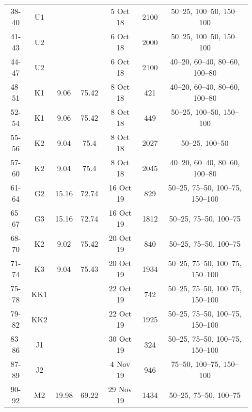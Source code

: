 \begin{table}[htbp]
{\begin{adjustwidth}{0.5in}{0in}
\begin{tabular}{ccccccc}
				38-40       & U1  &            &            & 5 Oct 18                  & 2100       & 50–25, 100–50, 150–100        \\
				41-43       & U2  &            &            & 6 Oct 18                  & 2000       & 50–25, 100–50, 150–100        \\
				44-47       & U2  &            &            & 6 Oct 18                  & 2100       & 40–20, 60–40, 80–60, 100–80   \\
				48-51       & K1  & 9.06       & 75.42      & 8 Oct 18                  & 421        & 40–20, 60–40, 80–60, 100–80   \\
				52-54       & K1  & 9.06       & 75.42      & 8 Oct 18                  & 449        & 50–25, 100–50, 150–100        \\
				55-56       & K2  & 9.04       & 75.4       & 8 Oct 18                  & 2027       & 50–25, 100–50                 \\
				57-60       & K2  & 9.04       & 75.4       & 8 Oct 18                  & 2045       & 40–20, 60–40, 80–60, 100–80   \\
				\midrule
				61-64       & G2  & 15.16      & 72.74      & 16 Oct 19                 & 829        & 50–25, 75–50, 100–75, 150–100 \\
				65-67       & G3  & 15.16      & 72.74      & 16 Oct 19                 & 1812       & 50–25, 75–50, 100–75          \\
				68-70       & K2  & 9.02       & 75.42      & 20 Oct 19                 & 840        & 50–25, 75–50, 100–75          \\
				71-74       & K3  & 9.04       & 75.43      & 20 Oct 19                 & 1934       & 50–25, 75–50, 100–75, 150–100 \\
				75-78       & KK1 &            &            & 22 Oct 19                 & 742        & 50–25, 75–50, 100–75, 150–100 \\
				79-82       & KK2 &            &            & 22 Oct 19                 & 1925       & 50–25, 75–50, 100–75, 150–100 \\
				83-86         & J1  &            &            & 30 Oct 19                 & 324        & 50–25, 75–50, 100–75, 150–100 \\
				87-89         & J2  &            &            & 4 Nov 19                  & 946        & 75–50, 100–75, 150–100        \\
				90-92         & M2  & 19.98      & 69.22      & 29 Nov 19                 & 1434       & 50–25, 75–50, 100–75          \\

\end{tabular}
\end{adjustwidth}}
\end{table}
